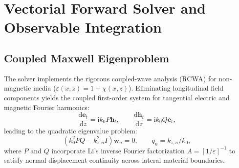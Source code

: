 \documentclass[11pt,a4paper]{article}
\newcommand{\HH}{\mathbf{h}}
\newcommand{\ii}{\mathrm{i}}
\newcommand{\dd}{\mathrm{d}}
\begin{document}
\section{Vectorial Forward Solver and Observable Integration}

\subsection{Coupled Maxwell Eigenproblem}
The solver implements the rigorous coupled-wave analysis (RCWA) for non-magnetic media ($\varepsilon(x,z) = 1 + \chi(x,z)$). Eliminating longitudinal field components yields the coupled first-order system for tangential electric and magnetic Fourier harmonics:
\begin{equation}
    \frac{\dd\mathbf e_t}{\dd z} = \ii k_0 P \HH_t, \qquad
    \frac{\dd\HH_t}{\dd z} = \ii k_0 Q \mathbf e_t,
\end{equation}
leading to the quadratic eigenvalue problem:
\begin{equation}
    \left( k_0^2 P Q - k_{z,n}^2 I \right) \mathbf w_n = 0, \qquad q_n = k_{z,n}/k_0,
\end{equation}
where $P$ and $Q$ incorporate Li's inverse Fourier factorization $A = [1/\varepsilon]^{-1}$ to satisfy normal displacement continuity across lateral material boundaries.
\end{document}
